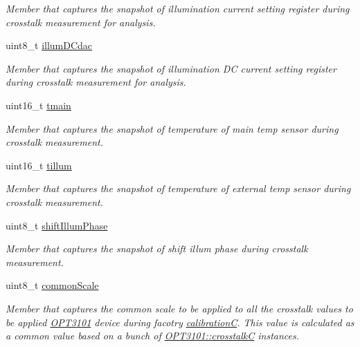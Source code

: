 \begin{DoxyCompactItemize}
\begin{DoxyCompactList}\small\item\em Member that captures the snapshot of illumination current setting register during crosstalk measurement for analysis. \end{DoxyCompactList}\item 
uint8\+\_\+t \mbox{\hyperlink{class_o_p_t3101_1_1crosstalk_c_aa25494ff4a32e26e0abfa158b2e60808}{illum\+D\+Cdac}}
\begin{DoxyCompactList}\small\item\em Member that captures the snapshot of illumination DC current setting register during crosstalk measurement for analysis. \end{DoxyCompactList}\item 
uint16\+\_\+t \mbox{\hyperlink{class_o_p_t3101_1_1crosstalk_c_a8b7250b531e953587c665c2c43860d82}{tmain}}
\begin{DoxyCompactList}\small\item\em Member that captures the snapshot of temperature of main temp sensor during crosstalk measurement. \end{DoxyCompactList}\item 
uint16\+\_\+t \mbox{\hyperlink{class_o_p_t3101_1_1crosstalk_c_ab1d1d581f0495f5695ad49a2a8a41fd3}{tillum}}
\begin{DoxyCompactList}\small\item\em Member that captures the snapshot of temperature of external temp sensor during crosstalk measurement. \end{DoxyCompactList}\item 
uint8\+\_\+t \mbox{\hyperlink{class_o_p_t3101_1_1crosstalk_c_ae60d9239aa603895c534e954ee87c613}{shift\+Illum\+Phase}}
\begin{DoxyCompactList}\small\item\em Member that captures the snapshot of shift illum phase during crosstalk measurement. \end{DoxyCompactList}\item 
uint8\+\_\+t \mbox{\hyperlink{class_o_p_t3101_1_1crosstalk_c_a933c7f37d5a48d74a4dd783cf07ed040}{common\+Scale}}
\begin{DoxyCompactList}\small\item\em Member that captures the common scale to be applied to all the crosstalk values to be applied \mbox{\hyperlink{namespace_o_p_t3101}{O\+P\+T3101}} device during facotry \mbox{\hyperlink{class_o_p_t3101_1_1calibration_c}{calibrationC}}. This value is calculated as a common value based on a bunch of \mbox{\hyperlink{class_o_p_t3101_1_1crosstalk_c}{O\+P\+T3101\+::crosstalkC}} instances. \end{DoxyCompactList}\end{DoxyCompactItemize}
